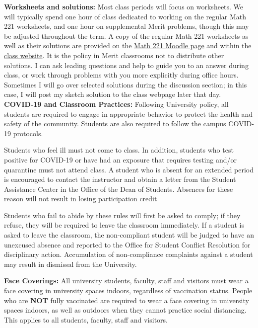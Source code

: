 \documentclass[12pt]{article}
\begin{document}
\noindent \textbf{Worksheets and solutions:} Most class periods will focus on worksheets. We will typically spend one hour of class dedicated to working on the regular Math 221 worksheets, and one hour on supplemental Merit problems, though this may be adjusted throughout the term. A copy of the regular Math 221 worksheets as well as their solutions are provided on the \textcolor{blue}{\href{}{Math 221 Moodle page}} and within the \textcolor{blue}{\href{https://htrungvu.com/fall2021_calc1.html}{class website}}. It is the policy in Merit classrooms not to distribute other solutions. I can ask leading questions and help to guide you to an answer during class, or work through problems with you more explicitly during office hours. Sometimes I will go over selected solutions during the discussion section; in this case, I will post my sketch solution to the class webpage later that day.\\


\noindent \textbf{COVID-19 and Classroom Practices:} Following University policy, all students are required to engage in appropriate behavior to protect the health and safety of the community. Students are also required to follow the campus COVID-19 protocols.

Students who feel ill must not come to class. In addition, students who test positive for COVID-19 or have had an exposure that requires testing and/or quarantine must not attend class. A student who is absent for an extended period is encouraged to contact the instructor and obtain a letter from the Student Assistance Center in the Office of the Dean of Students. Absences for these reason will not result in losing participation credit
   
Students who fail to abide by these rules will first be asked to comply; if they refuse, they will be required to leave the classroom immediately. If a student is asked to leave the classroom, the non-compliant student will be judged to have an unexcused absence and reported to the Office for Student Conflict Resolution for disciplinary action. Accumulation of non-compliance complaints against a student may result in dismissal from the University.

\textbf{Face Coverings:} All university students, faculty, staff and visitors must wear a face covering in university spaces indoors, regardless of vaccination status. People who are \textbf{NOT} fully vaccinated are required to wear a face covering in university spaces indoors, as well as outdoors when they cannot practice social distancing. This applies to all students, faculty, staff and visitors. 
	
\end{document}
